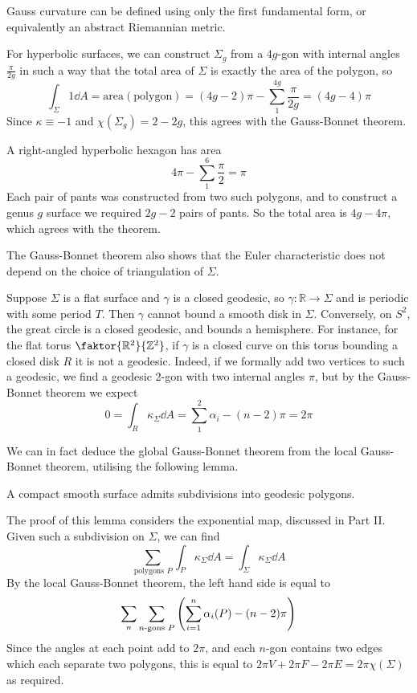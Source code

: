 \begin{remark}
	Gauss curvature can be defined using only the first fundamental form, or equivalently an abstract Riemannian metric.

	For hyperbolic surfaces, we can construct \( \Sigma_g \) from a \( 4g \)-gon with internal angles \( \frac{\pi}{2g} \) in such a way that the total area of \( \Sigma \) is exactly the area of the polygon, so
	\[ \int_\Sigma 1 \dd{A} = \mathrm{area}(\mathrm{polygon}) = (4g-2)\pi - \sum_{1}^{4g} \frac{\pi}{2g} = (4g-4)\pi \]
	Since \( \kappa \equiv -1 \) and \( \chi(\Sigma_g) = 2-2g \), this agrees with the Gauss-Bonnet theorem.

	A right-angled hyperbolic hexagon has area
	\[ 4\pi - \sum_{1}^6 \frac{\pi}{2} = \pi \]
	Each pair of pants was constructed from two such polygons, and to construct a genus \( g \) surface we required \( 2g-2 \) pairs of pants.
	So the total area is \( 4g-4\pi \), which agrees with the theorem.

	The Gauss-Bonnet theorem also shows that the Euler characteristic does not depend on the choice of triangulation of \( \Sigma \).

	Suppose \( \Sigma \) is a flat surface and \( \gamma \) is a closed geodesic, so \( \gamma \colon \mathbb R \to \Sigma \) and is periodic with some period \( T \).
	Then \( \gamma \) cannot bound a smooth disk in \( \Sigma \).
	Conversely, on \( S^2 \), the great circle is a closed geodesic, and bounds a hemisphere.
	For instance, for the flat torus \( \faktor{\mathbb R^2}{\mathbb Z^2} \), if \( \gamma \) is a closed curve on this torus bounding a closed disk \( R \) it is not a geodesic.
	Indeed, if we formally add two vertices to such a geodesic, we find a geodesic 2-gon with two internal angles \( \pi \), but by the Gauss-Bonnet theorem we expect
	\[ 0 = \int_R \kappa_\Sigma \dd{A} = \sum_1^2 \alpha_i - (n-2)\pi = 2\pi \]
\end{remark}
We can in fact deduce the global Gauss-Bonnet theorem from the local Gauss-Bonnet theorem, utilising the following lemma.
\begin{lemma}
	A compact smooth surface admits subdivisions into geodesic polygons.
\end{lemma}
The proof of this lemma considers the exponential map, discussed in Part II.
Given such a subdivision on \( \Sigma \), we can find
\[ \sum_{\text{polygons } P} \int_P \kappa_\Sigma \dd{A} = \int_\Sigma \kappa_\Sigma \dd{A} \]
By the local Gauss-Bonnet theorem, the left hand side is equal to
\[ \sum_n \sum_{n\text{-gons } P} \qty(\sum_{i=1}^n \alpha_i(P) - (n-2)\pi) \]
Since the angles at each point add to \( 2\pi \), and each \( n \)-gon contains two edges which each separate two polygons, this is equal to \( 2\pi V + 2 \pi F - 2\pi E = 2\pi\chi(\Sigma) \) as required.

